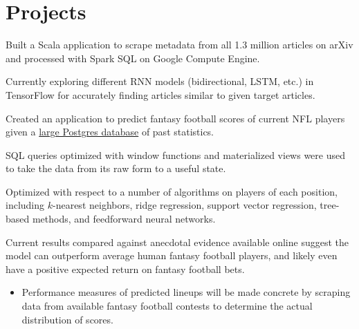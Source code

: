\documentclass[]{deedy-resume-openfont}
\begin{document}
\begin{minipage}[t]{0.66\textwidth}
\section{Projects}
\begin{tightemize}
\item Built a Scala application to scrape metadata from all 1.3 million articles on arXiv and processed with Spark SQL on Google Compute Engine.
\item Currently exploring different RNN models (bidirectional, LSTM, etc.) in TensorFlow for accurately finding articles similar to given target articles.
\end{tightemize}
\begin{tightemize} 
\item Created an application to predict fantasy football scores of current NFL players given a \href{https://github.com/BurntSushi/nfldb}{large Postgres database} of past statistics.
\item SQL queries optimized with window functions and materialized views were used to take the data from its raw form to a useful state.
\item Optimized with respect to a number of algorithms on players of each position, including $k$-nearest neighbors, ridge regression, support vector regression, tree-based methods, and feedforward neural networks.
\item Current results compared against anecdotal evidence available online suggest the model can outperform average human fantasy football players, and likely even have a positive expected return on fantasy football bets.
  \begin{itemize}
  \item Performance measures of predicted lineups will be made concrete by scraping data from available fantasy football contests to determine the actual distribution of scores.
  \end{itemize}
\end{tightemize}


\end{minipage}
\end{document}
